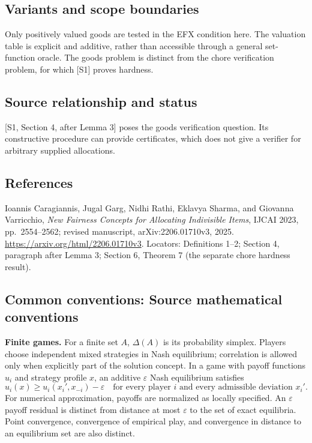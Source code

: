\documentclass[11pt,a4paper]{article}
\begin{document}
\subsection*{Variants and scope boundaries}
Only positively valued goods are tested in the EFX condition here.
The valuation table is explicit and additive, rather than accessible
through a general set-function oracle. The goods problem is distinct
from the chore verification problem, for which [S1] proves hardness.

\subsection*{Source relationship and status}
[S1, Section 4, after Lemma 3] poses the goods verification question.
Its constructive procedure can provide certificates, which does not
give a verifier for arbitrary supplied allocations.

\subsection*{References}
\begingroup\footnotesize\raggedright
\noindent[S1] Ioannis Caragiannis, Jugal Garg, Nidhi Rathi,
Eklavya Sharma, and Giovanna Varricchio,
\emph{New Fairness Concepts for Allocating Indivisible Items},
IJCAI 2023, pp.~2554--2562; revised manuscript,
arXiv:2206.01710v3, 2025.
\url{https://arxiv.org/html/2206.01710v3}.
Locators: Definitions 1--2; Section 4, paragraph after Lemma 3;
Section 6, Theorem 7 (the separate chore hardness result).
\par\endgroup

\subsection*{Common conventions: Source mathematical conventions}

\textbf{Finite games.} For a finite set $A$, $\Delta(A)$ is its probability
simplex. Players choose independent mixed strategies in Nash equilibrium;
correlation is allowed only when explicitly part of the solution concept.
In a game with payoff functions $u_i$ and strategy profile $x$, an additive
$\varepsilon$ Nash equilibrium satisfies
\[
 u_i(x)\geq u_i(x_i',x_{-i})-\varepsilon
 \quad\text{for every player $i$ and every admissible deviation $x_i'$}.
\]
For numerical approximation, payoffs are normalized as locally specified.
An $\varepsilon$ payoff residual is distinct from distance at most
$\varepsilon$ to the set of exact equilibria. Point convergence, convergence
of empirical play, and convergence in distance to an equilibrium set are
also distinct.
\end{document}
